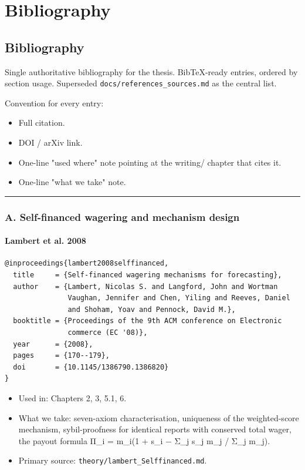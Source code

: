 \documentclass[11pt,a4paper,openany]{report}
\begin{document}
\part*{Bibliography}
\chapter{Bibliography}

Single authoritative bibliography for the thesis. BibTeX-ready entries,
ordered by section usage. Superseded \texttt{docs/references\_sources.md} as the
central list.

Convention for every entry:
\begin{itemize}
  \item Full citation.
  \item DOI / arXiv link.
  \item One-line "used where" note pointing at the writing/ chapter that
    cites it.
  \item One-line "what we take" note.
\end{itemize}

\vspace{0.6em}\hrule\vspace{0.6em}

\section{A. Self-financed wagering and mechanism design}

\subsection{Lambert et al. 2008}

\begin{verbatim}
@inproceedings{lambert2008selffinanced,
  title     = {Self-financed wagering mechanisms for forecasting},
  author    = {Lambert, Nicolas S. and Langford, John and Wortman
               Vaughan, Jennifer and Chen, Yiling and Reeves, Daniel
               and Shoham, Yoav and Pennock, David M.},
  booktitle = {Proceedings of the 9th ACM conference on Electronic
               commerce (EC '08)},
  year      = {2008},
  pages     = {170--179},
  doi       = {10.1145/1386790.1386820}
}
\end{verbatim}

\begin{itemize}
  \item Used in: Chapters 2, 3, 5.1, 6.
  \item What we take: seven-axiom characterisation, uniqueness of the
    weighted-score mechanism, sybil-proofness for identical reports with
    conserved total wager, the payout formula
    Π\_i = m\_i(1 + s\_i − Σ\_j s\_j m\_j / Σ\_j m\_j).
  \item Primary source: \texttt{theory/lambert\_Selffinanced.md}.
\end{itemize}
\end{document}
